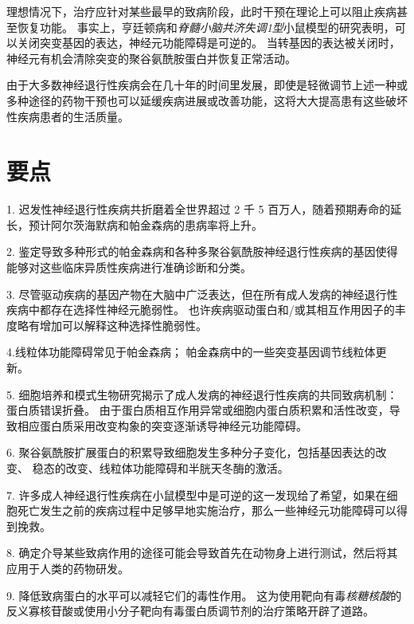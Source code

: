 理想情况下，治疗应针对某些最早的致病阶段，此时干预在理论上可以阻止疾病甚至恢复功能。
事实上，亨廷顿病和\textit{脊髓小脑共济失调1型}小鼠模型的研究表明，可以关闭突变基因的表达，神经元功能障碍是可逆的。
当转基因的表达被关闭时，神经元有机会清除突变的聚谷氨酰胺蛋白并恢复正常活动。


由于大多数神经退行性疾病会在几十年的时间里发展，即使是轻微调节上述一种或多种途径的药物干预也可以延缓疾病进展或改善功能，这将大大提高患有这些破坏性疾病患者的生活质量。



\section{要点}

1. 迟发性神经退行性疾病共折磨着全世界超过 2 千 5 百万人，随着预期寿命的延长，预计阿尔茨海默病和帕金森病的患病率将上升。 


2. 鉴定导致多种形式的帕金森病和各种多聚谷氨酰胺神经退行性疾病的基因使得能够对这些临床异质性疾病进行准确诊断和分类。


3. 尽管驱动疾病的基因产物在大脑中广泛表达，但在所有成人发病的神经退行性疾病中都存在选择性神经元脆弱性。
也许疾病驱动蛋白和/或其相互作用因子的丰度略有增加可以解释这种选择性脆弱性。


4.线粒体功能障碍常见于帕金森病；
帕金森病中的一些突变基因调节线粒体更新。


5. 细胞培养和模式生物研究揭示了成人发病的神经退行性疾病的共同致病机制：蛋白质错误折叠。
由于蛋白质相互作用异常或细胞内蛋白质积累和活性改变，导致相应蛋白质采用改变构象的突变逐渐诱导神经元功能障碍。


6. 聚谷氨酰胺扩展蛋白的积累导致细胞发生多种分子变化，包括基因表达的改变、 稳态的改变、线粒体功能障碍和半胱天冬酶的激活。


7. 许多成人神经退行性疾病在小鼠模型中是可逆的这一发现给了希望，如果在细胞死亡发生之前的疾病过程中足够早地实施治疗，那么一些神经元功能障碍可以得到挽救。


8. 确定介导某些致病作用的途径可能会导致首先在动物身上进行测试，然后将其应用于人类的药物研发。


9. 降低致病蛋白的水平可以减轻它们的毒性作用。
这为使用靶向有毒\textit{核糖核酸}的反义寡核苷酸或使用小分子靶向有毒蛋白质调节剂的治疗策略开辟了道路。
